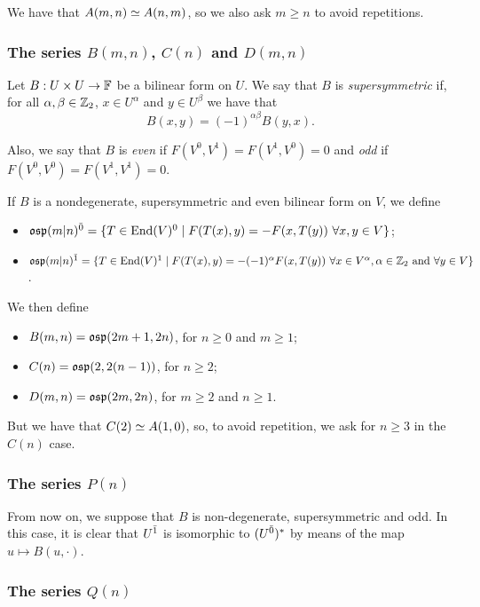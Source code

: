 We have that $A(m,n)\simeq A(n,m)$, so we also ask $m\geq n$ to avoid repetitions.

\subsubsection{The series $B(m,n)$, $C(n)$ and $D(m,n)$}

Let $B:U\times U \rightarrow \mathbb{F}$ be a bilinear form on $U$. We say that $B$ is \emph{supersymmetric} if, for all $\alpha,\beta\in\mathbb{Z}_{2}$, $x\in U^{\alpha}$ and $y\in U^{\beta}$ we have that
\[B(x,y) = (-1)^{\alpha\beta}B(y,x).\]

Also, we say that $B$ is \emph{even} if $F(V^0,V^1) = F(V^1,V^0)=0$ and \emph{odd} if $F(V^0,V^0) = F(V^1,V^1)=0$.

If $B$ is a nondegenerate, supersymmetric and even bilinear form on $V$, we define

\begin{itemize}
    \item $\mathfrak{osp}(m|n)^{\bar0} = \{T\in \operatorname{End} (V)^{0} \mid F(T(x),y) = - F(x,T   (y))\,\, \forall x,y\in V\}$;
    \item $\mathfrak{osp}(m|n)^{\bar1} = \{T\in \operatorname{End} (V)^{1} \mid F(T(x),y) = -(-1)^{\alpha} F(x,T(y))
	         \,\, \forall x\in V^{\alpha}, \alpha\in\mathbb{Z}_2 \text{ and } \forall y\in V\}$.
\end{itemize}

We then define

  \begin{itemize}
   \item $B(m,n) = \mathfrak{osp}(2m+1,2n)$, for $n\geq 0$ and $m\geq 1$;
   \item $C(n) = \mathfrak{osp}(2, 2(n-1))$, for $n\geq 2$;
   \item $D(m,n) = \mathfrak{osp}(2m,2n)$, for $m\geq 2$ and $n\geq 1$.
  \end{itemize}
But we have that $C(2)\simeq A(1,0)$, so, to avoid repetition, we ask for $n\geq 3$ in the $C(n)$ case. 

\subsubsection{The series $P(n)$}
From now on, we suppose that $B$ is non-degenerate, supersymmetric and odd. In this case, it is clear that $U^{\bar1}$ is isomorphic to $(U^{\bar0})^*$ by means of the map $u \mapsto B(u, \cdot)$. %

\subsubsection{The series $Q(n)$}


